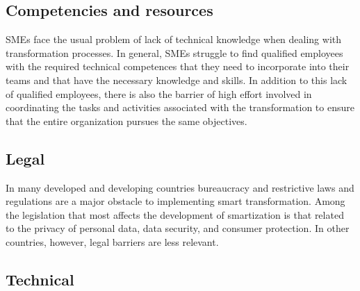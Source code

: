 \documentclass[
  letterpaper,
  DIV=11,
  numbers=noendperiod]{scrreprt}
\begin{document}
\hypertarget{competencies-and-resources}{%
\subsection{Competencies and
resources}\label{competencies-and-resources}}

SMEs face the usual problem of lack of technical knowledge when dealing
with transformation processes. In general, SMEs struggle to find
qualified employees with the required technical competences that they
need to incorporate into their teams and that have the necessary
knowledge and skills. In addition to this lack of qualified employees,
there is also the barrier of high effort involved in coordinating the
tasks and activities associated with the transformation to ensure that
the entire organization pursues the same objectives.

\hypertarget{legal}{%
\subsection{Legal}\label{legal}}

In many developed and developing countries bureaucracy and restrictive
laws and regulations are a major obstacle to implementing smart
transformation. Among the legislation that most affects the development
of smartization is that related to the privacy of personal data, data
security, and consumer protection. In other countries, however, legal
barriers are less relevant.

\hypertarget{technical}{%
\subsection{Technical}\label{technical}}
\end{document}
